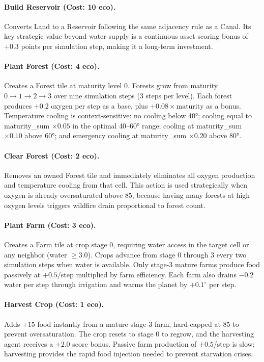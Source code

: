 \documentclass[12pt,a4paper]{article}
\begin{document}
\paragraph{Build Reservoir (Cost: 10 eco).} Converts Land to a Reservoir following the same adjacency rule as a Canal. Its key strategic value beyond water supply is a continuous asset scoring bonus of $+0.3$ points per simulation step, making it a long-term investment.

\paragraph{Plant Forest (Cost: 4 eco).} Creates a Forest tile at maturity level 0. Forests grow from maturity $0 \to 1 \to 2 \to 3$ over nine simulation steps (3 steps per level). Each forest produces $+0.2$ oxygen per step as a base, plus $+0.08 \times \text{maturity}$ as a bonus. Temperature cooling is context-sensitive: no cooling below 40°; cooling equal to maturity\_sum $\times 0.05$ in the optimal 40–60° range; cooling at maturity\_sum $\times 0.10$ above 60°; and emergency cooling at maturity\_sum $\times 0.20$ above 80°.

\paragraph{Clear Forest (Cost: 2 eco).} Removes an owned Forest tile and immediately eliminates all oxygen production and temperature cooling from that cell. This action is used strategically when oxygen is already oversaturated above 85, because having many forests at high oxygen levels triggers wildfire drain proportional to forest count.

\paragraph{Plant Farm (Cost: 3 eco).} Creates a Farm tile at crop stage 0, requiring water access in the target cell or any neighbor (water $\geq 3.0$). Crops advance from stage 0 through 3 every two simulation steps when water is available. Only stage-3 mature farms produce food passively at $+0.5$/step multiplied by farm efficiency. Each farm also drains $-0.2$ water per step through irrigation and warms the planet by $+0.1^\circ$ per step.

\paragraph{Harvest Crop (Cost: 1 eco).} Adds $+15$ food instantly from a mature stage-3 farm, hard-capped at 85 to prevent oversaturation. The crop resets to stage 0 to regrow, and the harvesting agent receives a $+2.0$ score bonus. Passive farm production of $+0.5$/step is slow; harvesting provides the rapid food injection needed to prevent starvation crises.
\end{document}
